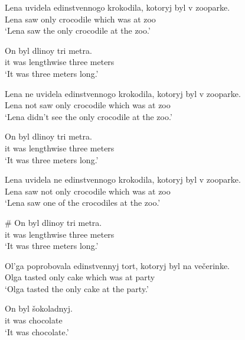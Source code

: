 \begin{exe}
	\ex \begin{xlist}
		\ex \gll Lena uvidela edinstvennogo krokodila, kotoryj byl v zooparke.\\
		Lena saw only crocodile which was at zoo\\
		\glt `Lena saw the only crocodile at the zoo.'

		\ex \gll On byl dlinoy tri metra.\\
		it was lengthwise three meters\\
		\glt `It was three meters long.'
	\end{xlist}

	\ex \begin{xlist}
		\ex \gll Lena ne uvidela edinstvennogo krokodila, kotoryj byl v zooparke.\\
		Lena not saw only crocodile which was at zoo\\
		\glt `Lena didn't see the only crocodile at the zoo.'

		\ex \gll On byl dlinoy tri metra.\\
		it was lengthwise three meters\\
		\glt `It was three meters long.'
	\end{xlist}

	\ex \label{lena3} \begin{xlist}
		\ex \gll Lena uvidela ne edinstvennogo krokodila, kotoryj byl v zooparke.\\
		Lena saw not only crocodile which was at zoo\\
		\glt `Lena saw one of the crocodiles at the zoo.'

		\ex \gll \# On byl dlinoy tri metra.\\
		{} it was lengthwise three meters\\
		\glt `It was three meters long.'
	\end{xlist}

	\ex \begin{xlist}
		\ex \gll Ol'ga poprobovala edinstvennyj tort, kotoryj byl na ve\v{c}erinke.\\
		Olga tasted only cake which was at party\\
		\glt `Olga tasted the only cake at the party.'

		\ex \gll On byl \v{s}okoladnyj.\\
		it was chocolate\\
		\glt `It was chocolate.'
	\end{xlist}


\end{exe}

